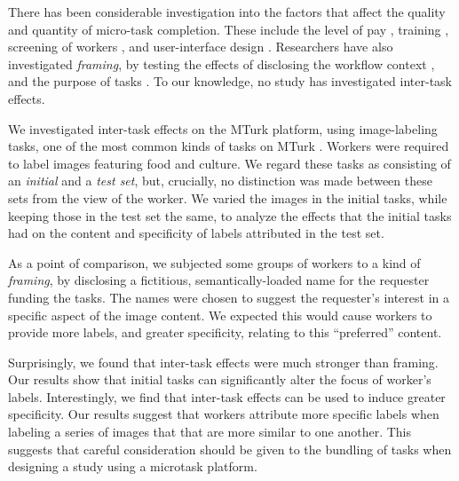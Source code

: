 \documentclass[letterpaper]{article}
\begin{document}
There has been considerable investigation into the factors that affect the 
quality and quantity of micro-task completion.  These include the level of 
pay \cite{kazai2013analysis}, training \cite{le2010ensuring}, screening of 
workers \cite{paolacci2010running}, and user-interface design 
\cite{Finnerty2013}.  Researchers have also investigated \textit{framing}, 
by testing the effects of disclosing the workflow context 
\cite{Kinnaird2012281}, and the purpose of tasks 
\cite{chandler2013breaking}.  To our knowledge, no study has investigated 
inter-task effects.

We investigated inter-task effects on the MTurk platform, using image-labeling 
tasks, one of the most common kinds of tasks on MTurk
\cite{chandler2013breaking,Berinsky2012351,Finnerty2013,paolacci2010running}.  
Workers were required to label images featuring 
food and culture.  We regard these tasks as consisting of an 
\textit{initial} and a \textit{test set}, but, crucially, no
distinction was made between these sets from the view of the worker.
We varied the images in the initial tasks, while keeping those in the test set 
the same, to analyze the effects that the initial tasks had on the 
content and specificity of labels attributed in the test set.

As a point of comparison, we subjected some groups of workers to a kind of
\textit{framing}, by disclosing a fictitious, semantically-loaded name for 
the requester funding the tasks.
The names were chosen to suggest the requester's interest in a specific 
aspect of the image content.  We expected this would cause workers 
to provide more labels, and greater specificity, relating to this 
``preferred'' content.

Surprisingly, we found that inter-task effects were much stronger than
framing.  Our results show that initial tasks can significantly alter the 
focus of worker's labels.  Interestingly, we find that inter-task
effects can be used to induce greater specificity.  Our results suggest that
workers attribute more specific labels when labeling a series of images that
that are more similar to one another.  This suggests that careful 
consideration should be given to the bundling of tasks when designing a study 
using a microtask platform.
\end{document}
